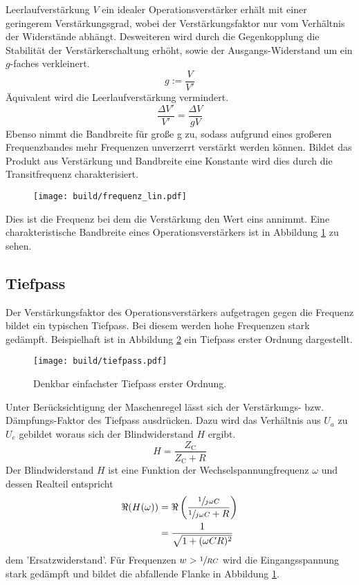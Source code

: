 Leerlaufverstärkung $V$ ein idealer Operationsverstärker erhält mit einer
geringerem Verstärkungsgrad, wobei der Verstärkungsfaktor nur vom Verhältnis
der Widerstände abhängt.
Desweiteren wird durch die Gegenkopplung die Stabilität der
Verstärkerschaltung erhöht, sowie der Ausgangs-Widerstand um ein $g$-faches
verkleinert.
\begin{equation}
		g := \frac{V}{V'}
\end{equation}
Äquivalent wird die Leerlaufverstärkung vermindert.
\begin{equation}
		\frac{\Delta V'}{V'} = \frac{\Delta V}{g V}
\end{equation}
Ebenso nimmt die Bandbreite für große g zu, sodass aufgrund eines großeren
Frequenzbandes mehr Frequenzen unverzerrt verstärkt werden können.
Bildet das Produkt aus Verstärkung und Bandbreite eine Konstante wird dies
durch die Transitfrequenz charakterisiert.
\begin{figure}[h]
		\centering
		\texttt{[image: build/frequenz\_lin.pdf]}
		\caption{\cite{anleitung}}
		\label{fig:freq}
\end{figure}
Dies ist die Frequenz bei dem die Verstärkung den Wert eins annimmt.
Eine charakteristische Bandbreite eines Operationsverstärkers ist in Abbildung
\ref{fig:freq} zu sehen.

\subsection{Tiefpass}%
\label{sub:tiefpass}

Der Verstärkungsfaktor des Operationsverstärkers aufgetragen gegen die Frequenz bildet ein typischen
Tiefpass.
Bei diesem werden hohe Frequenzen stark gedämpft.
Beispielhaft ist in Abbildung \ref{fig:tiefpass} ein Tiefpass erster Ordnung
dargestellt.
\begin{figure}[h]
		\centering
		\texttt{[image: build/tiefpass.pdf]}
		\caption{Denkbar einfachster Tiefpass erster Ordnung. \cite{wiki}}
		\label{fig:tiefpass}
\end{figure}
Unter Berücksichtigung der Maschenregel lässt sich der Verstärkungs- bzw.
Dämpfungs-Faktor des Tiefpass ausdrücken.
Dazu wird das Verhältnis aus $U_a$ zu $U_e$ gebildet woraus sich der
Blindwiderstand $H$ ergibt.
\begin{equation}
		\label{eq:blindwiederstand}
		H = \frac{Z_\text{C}}{Z_\text{C} + R}
\end{equation}
Der Blindwiderstand $H$ ist eine Funktion der Wechselspannungfrequenz $\omega$
und dessen Realteil entspricht
\begin{align}
		\label{eq:h_betrag}
		\Re(H(\omega))  &= \Re \left(\frac{\sfrac{1}{j \omega C}}{\sfrac{1}{j\omega
		C} + R} \right) \\
								 &= \frac{1}{\sqrt{1 + (\omega CR)^2}}
\end{align}
dem 'Ersatzwiderstand'.
Für Frequenzen $w > \sfrac{1}{RC}$ wird die Eingangsspannung stark gedämpft und bildet
die abfallende Flanke in Abbildung \ref{fig:freq}.

